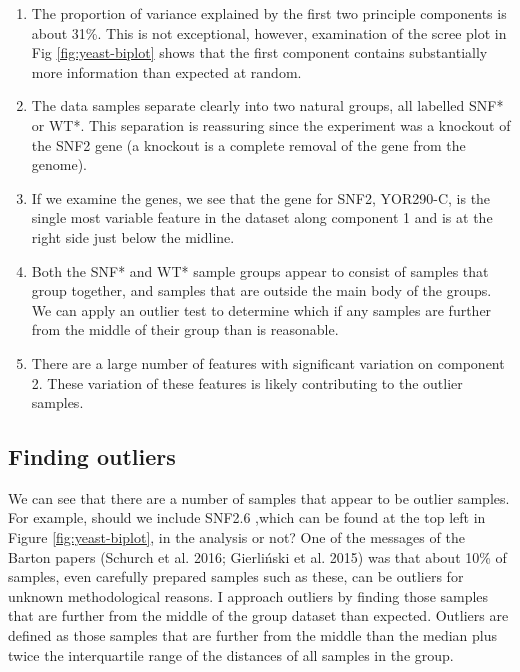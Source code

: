 \documentclass[onecolumn]{article}
\providecommand{\tightlist}{%
  \setlength{\itemsep}{0pt}\setlength{\parskip}{0pt}}
\begin{document}
\begin{enumerate}
\def\labelenumi{\arabic{enumi})}
\tightlist
\item
  The proportion of variance explained by the first two principle components is about 31\%. This is not exceptional, however, examination of the scree plot in Fig \ref{fig:yeast-biplot} shows that the first component contains substantially more information than expected at random.
\item
  The data samples separate clearly into two natural groups, all labelled SNF* or WT*. This separation is reassuring since the experiment was a knockout of the SNF2 gene (a knockout is a complete removal of the gene from the genome).
\item
  If we examine the genes, we see that the gene for SNF2, YOR290-C, is the single most variable feature in the dataset along component 1 and is at the right side just below the midline.
\item
  Both the SNF* and WT* sample groups appear to consist of samples that group together, and samples that are outside the main body of the groups. We can apply an outlier test to determine which if any samples are further from the middle of their group than is reasonable.
\item
  There are a large number of features with significant variation on component 2. These variation of these features is likely contributing to the outlier samples.
\end{enumerate}

\hypertarget{finding-outliers}{%
\subsection{Finding outliers}\label{finding-outliers}}

We can see that there are a number of samples that appear to be outlier samples. For example, should we include SNF2.6 ,which can be found at the top left in Figure \ref{fig:yeast-biplot}, in the analysis or not? One of the messages of the Barton papers (Schurch et al. 2016; Gierliński et al. 2015) was that about 10\% of samples, even carefully prepared samples such as these, can be outliers for unknown methodological reasons. I approach outliers by finding those samples that are further from the middle of the group dataset than expected. Outliers are defined as those samples that are further from the middle than the median plus twice the interquartile range of the distances of all samples in the group.
\end{document}
